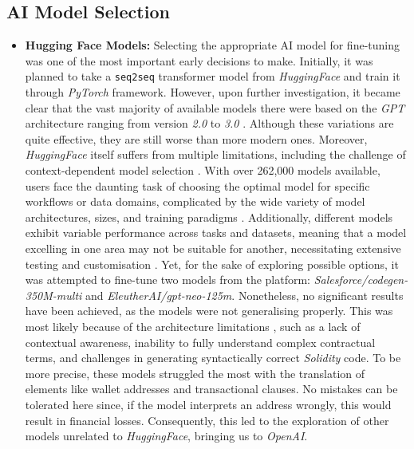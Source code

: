 \subsection{AI Model Selection}

\begin{itemize}
    \item \textbf{Hugging Face Models:} Selecting the appropriate AI model for fine-tuning was one of the most important early decisions to make. Initially, it was planned to take a \texttt{seq2seq} transformer model from \textit{HuggingFace} and train it through \textit{PyTorch} framework. However, upon further investigation, it became clear that the vast majority of available models there were based on the \textit{GPT} architecture ranging from version \textit{2.0} to \textit{3.0} \cite{GerstmayrEtAl2024, Campesato2023}. Although these variations are quite effective, they are still worse than more modern ones. Moreover, \textit{HuggingFace} itself suffers from multiple limitations, including the challenge of context-dependent model selection \cite{NarayananEtAl2023}. With over 262,000 models available, users face the daunting task of choosing the optimal model for specific workflows or data domains, complicated by the wide variety of model architectures, sizes, and training paradigms \cite{Jones2024, NarayananEtAl2023}. Additionally, different models exhibit variable performance across tasks and datasets, meaning that a model excelling in one area may not be suitable for another, necessitating extensive testing and customisation \cite{NarayananEtAl2023, Campesato2023}. Yet, for the sake of exploring possible options, it was attempted to fine-tune two models from the platform: \textit{Salesforce/codegen-350M-multi} and \textit{EleutherAI/gpt-neo-125m}. Nonetheless, no significant results have been achieved, as the models were not generalising properly. This was most likely because of the architecture limitations \cite{LucianoEtAl2020}, such as a lack of contextual awareness, inability to fully understand complex contractual terms, and challenges in generating syntactically correct \textit{Solidity} code. To be more precise, these models struggled the most with the translation of elements like wallet addresses and transactional clauses. No mistakes can be tolerated here since, if the model interprets an address wrongly, this would result in financial losses. Consequently, this led to the exploration of other models unrelated to \textit{HuggingFace}, bringing us to \textit{OpenAI}. 

\end{itemize}
